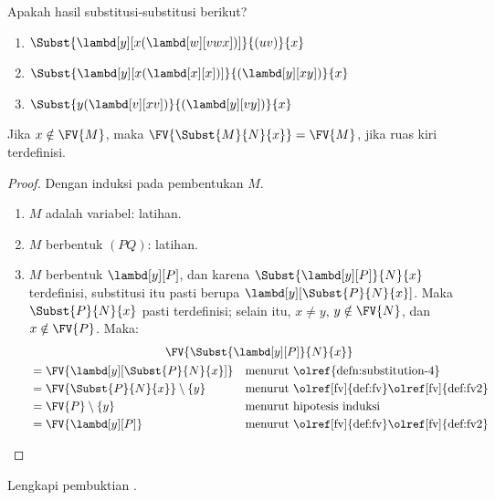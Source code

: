 \documentclass[../../../include/open-logic-section]{subfiles}
\begin{document}
\begin{prob}
  Apakah hasil substitusi-substitusi berikut?
  \begin{enumerate}
  \item $\Subst{\lambd[y][x(\lambd[w][vwx])]}{(uv)}{x}$
  \item $\Subst{\lambd[y][x(\lambd[x][x])]}{(\lambd[y][xy])}{x}$
  \item $\Subst{y(\lambd[v][xv])}{(\lambd[y][vy])}{x}$
  \end{enumerate}
\end{prob}

\begin{thm} 
  Jika $x \notin \FV{M}$, maka $\FV{\Subst{M}{N}{x}} = \FV{M}$, jika
  ruas kiri terdefinisi.
\end{thm}

\begin{proof}
  Dengan induksi pada pembentukan $M$.
  \begin{enumerate}
  \item $M$ adalah variabel: latihan.
  \item $M$ berbentuk $(PQ)$: latihan.
  \item $M$ berbentuk $\lambd[y][P]$, dan karena
    $\Subst{\lambd[y][P]}{N}{x}$ terdefinisi, substitusi itu pasti berupa
    $\lambd[y][\Subst{P}{N}{x}]$. Maka $\Subst{P}{N}{x}$ pasti terdefinisi;
    selain itu, $x \neq y$, $y \notin \FV{N}$, dan $x \notin \FV{P}$.
    Maka:
    \begin{multline*}
      \FV{\Subst{\lambd[y][P]}{N}{x}} \\
    \begin{aligned}
      & = \FV{\lambd[y][\Subst{P}{N}{x}]} &&
      \text{menurut \olref{defn:substitution-4}}\\
      & = \FV{\Subst{P}{N}{x}} \setminus \{y\} &&
      \text{menurut \olref[fv]{def:fv}\olref[fv]{def:fv2}}\\
      & = \FV{P} \setminus \{y\} && \text{menurut hipotesis induksi} \\
      & = \FV{\lambd[y][P]} &&
      \text{menurut \olref[fv]{def:fv}\olref[fv]{def:fv2}}
    \end{aligned}
    \end{multline*}
  \end{enumerate}
\end{proof}

\begin{prob}
  Lengkapi pembuktian .
\end{prob}
\end{document}
